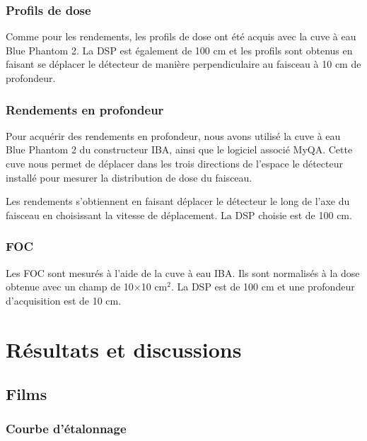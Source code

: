 \documentclass{book}
\begin{document}
\subsection{Profils de dose}

Comme pour les rendements, les profils de dose ont été acquis avec la cuve à eau Blue Phantom 2. La DSP est également de 100 cm et les profils sont obtenus en faisant se déplacer le détecteur de manière perpendiculaire au faisceau à 10 cm de profondeur.

\subsection{Rendements en profondeur}

Pour acquérir des rendements en profondeur, nous avons utilisé la cuve à eau Blue Phantom 2 du constructeur IBA, ainsi que le logiciel associé MyQA. Cette cuve nous permet de déplacer dans les trois directions de l'espace le détecteur installé pour mesurer la distribution de dose du faisceau.

Les rendements s'obtiennent en faisant déplacer le détecteur le long de l'axe du faisceau en choisissant la vitesse de déplacement. La DSP choisie est de 100 cm.

\subsection{FOC}

Les FOC sont mesurés à l'aide de la cuve à eau IBA. Ils sont normalisés à la dose obtenue avec un champ de 10$\times$10 cm$^2$. La DSP est de 100 cm et une profondeur d'acquisition est de 10 cm.


\chapter{Résultats et discussions}
\section{Films}
\subsection{Courbe d'étalonnage}
\end{document}
